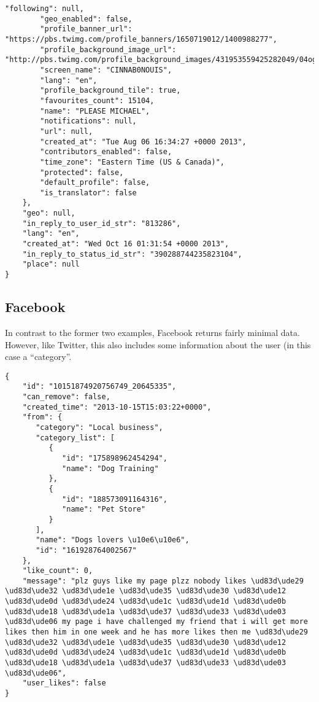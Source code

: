 \begin{lstlisting}[breaklines]
        "following": null, 
        "geo_enabled": false, 
        "profile_banner_url": "https://pbs.twimg.com/profile_banners/1650719012/1400988277", 
        "profile_background_image_url": "http://pbs.twimg.com/profile_background_images/431953559425282049/04og3Ngm.jpeg", 
        "screen_name": "CINNAB0NOUIS", 
        "lang": "en", 
        "profile_background_tile": true, 
        "favourites_count": 15104, 
        "name": "PLEASE MICHAEL", 
        "notifications": null, 
        "url": null, 
        "created_at": "Tue Aug 06 16:34:27 +0000 2013", 
        "contributors_enabled": false, 
        "time_zone": "Eastern Time (US & Canada)", 
        "protected": false, 
        "default_profile": false, 
        "is_translator": false
    }, 
    "geo": null, 
    "in_reply_to_user_id_str": "813286", 
    "lang": "en", 
    "created_at": "Wed Oct 16 01:31:54 +0000 2013", 
    "in_reply_to_status_id_str": "390288744235823104", 
    "place": null
}
\end{lstlisting}

\subsection{Facebook}
\label{raw:api:facebook}
In contrast to the former two examples, Facebook returns fairly minimal data. However, like Twitter, this also includes some information about the user (in this case a ``category''.
\begin{lstlisting}[breaklines]
{
    "id": "10151874920756749_20645335",
    "can_remove": false,
    "created_time": "2013-10-15T15:03:22+0000",
    "from": {
       "category": "Local business",
       "category_list": [
          {
             "id": "175898962454294",
             "name": "Dog Training"
          },
          {
             "id": "188573091164316",
             "name": "Pet Store"
          }
       ],
       "name": "Dogs lovers \u10e6\u10e6",
       "id": "161928764002567"
    },
    "like_count": 0,
    "message": "plz guys like my page plzz nobody likes \ud83d\ude29 \ud83d\ude32 \ud83d\ude1e \ud83d\ude35 \ud83d\ude30 \ud83d\ude12 \ud83d\ude0d \ud83d\ude24 \ud83d\ude1c \ud83d\ude1d \ud83d\ude0b \ud83d\ude18 \ud83d\ude1a \ud83d\ude37 \ud83d\ude33 \ud83d\ude03 \ud83d\ude06 my page i have challenged my friend that i will get more likes then him in one week and he has more likes then me \ud83d\ude29 \ud83d\ude32 \ud83d\ude1e \ud83d\ude35 \ud83d\ude30 \ud83d\ude12 \ud83d\ude0d \ud83d\ude24 \ud83d\ude1c \ud83d\ude1d \ud83d\ude0b \ud83d\ude18 \ud83d\ude1a \ud83d\ude37 \ud83d\ude33 \ud83d\ude03 \ud83d\ude06",
    "user_likes": false
}
\end{lstlisting}

